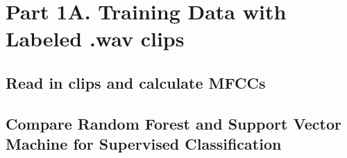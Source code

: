 \documentclass[
]{book}
\newenvironment{Shaded}{\begin{snugshade}}{\end{snugshade}}
\newcommand{\AttributeTok}[1]{\textcolor[rgb]{0.77,0.63,0.00}{#1}}
\newcommand{\DecValTok}[1]{\textcolor[rgb]{0.00,0.00,0.81}{#1}}
\newcommand{\FunctionTok}[1]{\textcolor[rgb]{0.00,0.00,0.00}{#1}}
\newcommand{\NormalTok}[1]{#1}
\newcommand{\OtherTok}[1]{\textcolor[rgb]{0.56,0.35,0.01}{#1}}
\newcommand{\SpecialCharTok}[1]{\textcolor[rgb]{0.00,0.00,0.00}{#1}}
\newcommand{\StringTok}[1]{\textcolor[rgb]{0.31,0.60,0.02}{#1}}
\begin{document}
\hypertarget{part-1a.-training-data-with-labeled-.wav-clips}{%
\section{Part 1A. Training Data with Labeled .wav clips}\label{part-1a.-training-data-with-labeled-.wav-clips}}

\hypertarget{read-in-clips-and-calculate-mfccs}{%
\subsection{Read in clips and calculate MFCCs}\label{read-in-clips-and-calculate-mfccs}}

\begin{Shaded}
\end{Shaded}

\hypertarget{compare-random-forest-and-support-vector-machine-for-supervised-classification}{%
\subsection{Compare Random Forest and Support Vector Machine for Supervised Classification}\label{compare-random-forest-and-support-vector-machine-for-supervised-classification}}
\end{document}
